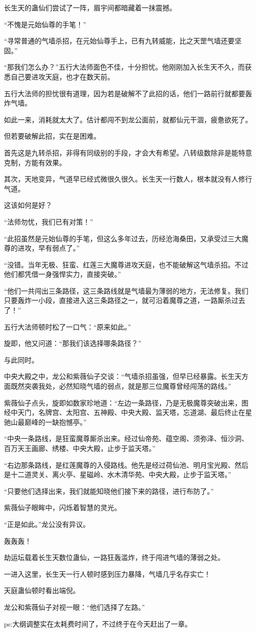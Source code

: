 \begin{this_body}
长生天的蛊仙们尝试了一阵，眉宇间都暗藏着一抹震撼。

“不愧是元始仙尊的手笔！”

“寻常普通的气墙杀招，在元始仙尊手上，已有九转威能，比之天罡气墙还要坚固。”

“那我们怎么办？”五行大法师面色不佳，十分担忧。他刚刚加入长生天不久，而获悉自己要进攻天庭，也才在数天前。

五行大法师的担忧很有道理，因为若是破解不了此招的话，他们一路前行就都要轰炸气墙。

如此一来，消耗就太大了。估计都闯不到龙公面前，就都仙元干涸，疲惫欲死了。

但若要破解此招，实在是困难。

首先这是九转杀招，非得有同级别的手段，才会大有希望。八转级数除非是能特意克制，方能有效果。

其次，天地变异，气道早已经式微很久很久。长生天一行数人，根本就没有人修行气道。

这该如何是好？

“法师勿忧，我们已有对策！”

“此招虽然是元始仙尊的手笔，但这么多年过去，历经沧海桑田，又承受过三大魔尊的进攻，早有弱点了。”

“没错。当年无极、狂蛮、红莲三大魔尊进攻天庭，也不能破解这气墙杀招。不过他们都凭借一身强悍实力，直接突破。”

“他们一共闯出三条路径，这三条路线就是气墙最为薄弱的地方，无法修复。我们只要轰炸一小段，直接进入这三条路径之一，就可沿着魔尊之道，一路厮杀过去了！”

五行大法师顿时松了一口气：“原来如此。”

旋即，他又问道：“那我们该选择哪条路径？”

与此同时。

中央大殿之中，龙公和紫薇仙子交谈：“气墙杀招虽强，但早已经暴露。长生天方面既然突袭我处，必然知晓气墙的弱点，就是那三位魔尊曾经闯荡的路线。”

紫薇仙子点头，旋即如数家珍地道：“左边一条路径，乃是无极魔尊突破出来，图经中天门，名牌宫、太阳宫、五神殿、中央大殿、监天塔，忘道湖、最后终止在星驰山最巅峰的一缺抱憾亭。”

“中央一条路线，是狂蛮魔尊厮杀出来。经过仙帝苑、蕴空阁、须弥泽、恒沙洞、百万天王画廊、绣楼、中央大殿，止步于监天塔。”

“右边那条路线，是红莲魔尊的入侵路线。他先是经过荷仙池、明月宝光殿、然后是十二道灵关、离火亭、星磁岭、水木清华苑、中央大殿，止步于监天塔。”

“只要他们选择出来，我们就能知晓他们接下来的路径，进行布防了。”

紫薇仙子眼眸中，闪烁着智慧的灵光。

“正是如此。”龙公没有异议。

轰轰轰！

劫运坛载着长生天数位蛊仙，一路狂轰滥炸，终于闯进气墙的薄弱之处。

一进入这里，长生天一行人顿时感到压力暴降，气墙几乎名存实亡！

天庭蛊仙顿时看出端倪。

龙公和紫薇仙子对视一眼：“他们选择了左路。”

ps:大纲调整实在太耗费时间了，不过终于在今天赶出了一章。

\end{this_body}

